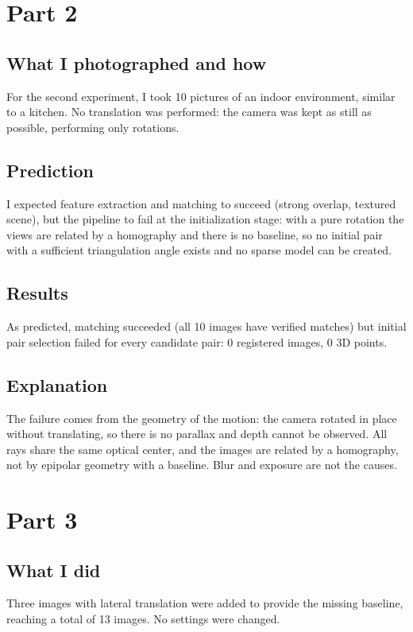 \documentclass[11pt,a4paper]{article}
\begin{document}
\section{Part 2}

\subsection*{What I photographed and how}
For the second experiment, I took 10 pictures of an indoor environment, similar to a kitchen. No translation was performed: the camera was kept as still as possible, performing only rotations.

\subsection*{Prediction}
I expected feature extraction and matching to succeed (strong overlap, textured scene), but the pipeline to fail at the initialization stage: with a pure rotation the views are related by a homography and there is no baseline, so no initial pair with a sufficient triangulation angle exists and no sparse model can be created.

\subsection*{Results}
As predicted, matching succeeded (all 10 images have verified matches) but initial pair selection failed for every candidate pair: 0 registered images, 0 3D points.

\subsection*{Explanation}
The failure comes from the geometry of the motion: the camera rotated in place without translating, so there is no parallax and depth cannot be observed. All rays share the same optical center, and the images are related by a homography, not by epipolar geometry with a baseline. Blur and exposure are not the causes.

\section{Part 3}

\subsection*{What I did}
Three images with lateral translation were added to provide the missing baseline, reaching a total of 13 images. No settings were changed.
\end{document}
